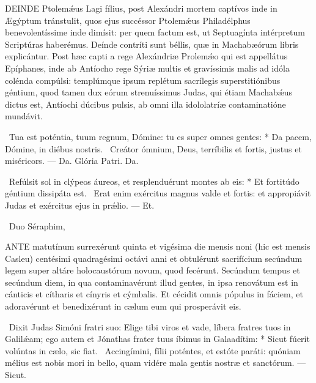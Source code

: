 
\lettrine[lines=2]{D}{EINDE} Ptolemǽus Lagi fílius, post Alexándri mortem captívos inde in Ægýptum tránstulit, quos ejus succéssor Ptolemǽus Philadélphus benevolentíssime inde dimísit: per quem factum est, ut Septuagínta intérpretum Scriptúras haberémus. Deínde contríti sunt béllis, quæ in Machabæórum libris explicántur. Post hæc capti a rege Alexándriæ Prolemǽo qui est appellátus Epíphanes, inde ab Antíocho rege Sýriæ multis et gravíssimis malis ad idóla colénda compúlsi: templúmque ipsum replétum sacrílegis superstitiónibus géntium, quod tamen dux eórum strenuíssimus Judas, qui étiam Machabǽus dictus est, Antíochi dúcibus pulsis, ab omni illa idololatríæ contaminatióne mundávit.

\R\ Tua est poténtia, tuum regnum, Dómine: tu es super omnes gentes: * Da pacem, Dómine, in diébus nostris. \V\ Creátor ómnium, Deus, terríbilis et fortis, justus et miséricors. — Da. Glória Patri. Da.

\R\ Refúlsit sol in clýpeos áureos, et resplenduérunt montes ab eis: * Et fortitúdo géntium dissipáta est. \V\ Erat enim exércitus magnus valde et fortis: et appropiávit Judas et exércitus ejus in prǽlio. — Et.

\R\ Duo Séraphim, 




\lettrine[lines=2]{A}{NTE} matutínum surrexérunt quinta et vigésima die mensis noni (hic est mensis Casleu) centésimi quadragésimi octávi anni et obtulérunt sacrifícium secúndum legem super altáre holocaustórum novum, quod fecérunt. Secúndum tempus et secúndum diem, in qua contaminavérunt illud gentes, in ipsa renovátum est in cánticis et cítharis et cínyris et cýmbalis. Et cécidit omnis pópulus in fáciem, et adoravérunt et benedixérunt in cælum eum qui prosperávit eis.

\R\ Dixit Judas Simóni fratri suo: Elige tibi viros et vade, líbera fratres tuos in Galilǽam; ego autem et Jónathas frater tuus íbimus in Galaadítim: * Sicut fúerit volúntas in cælo, sic fiat. \V\ Accingímini, fílii poténtes, et estóte paráti: quóniam mélius est nobis mori in bello, quam vidére mala gentis nostræ et sanctórum. — Sicut.


